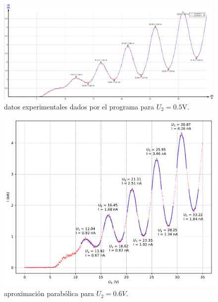 \documentclass[12pt,a4paper]{article}
\numberwithin{equation}{section}
\numberwithin{figure}{section}
\begin{document}
\begin{figure}[h!]  \centering
\includegraphics[scale=0.4]{0_5-1.png}
\caption{datos experimentales dados por el programa para $U_2=0.5$V.}
\label{Fig:3.21}
\end{figure}
\newpage
\begin{figure}[h!]  \centering
\includegraphics[scale=0.7]{Parabola-3.pdf}
\caption{aproximación parabólica para $U_2=0.6V$.}
\label{Fig:2.3}
\end{figure}
\end{document}

